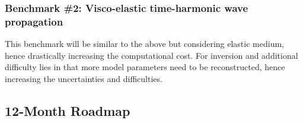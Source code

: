 

\subsubsection{Benchmark \#2: Visco-elastic time-harmonic wave propagation}
\label{subsec:WP4:Hawen:benchmark2}

This benchmark will be similar to the above but considering elastic medium,
hence drastically increasing the computational cost. For inversion and 
additional difficulty lies in that more model parameters need to be reconstructed,
hence increasing the uncertainties and difficulties.

\subsection{12-Month Roadmap}
\label{sec:WP4:Hawen:roadmap}

